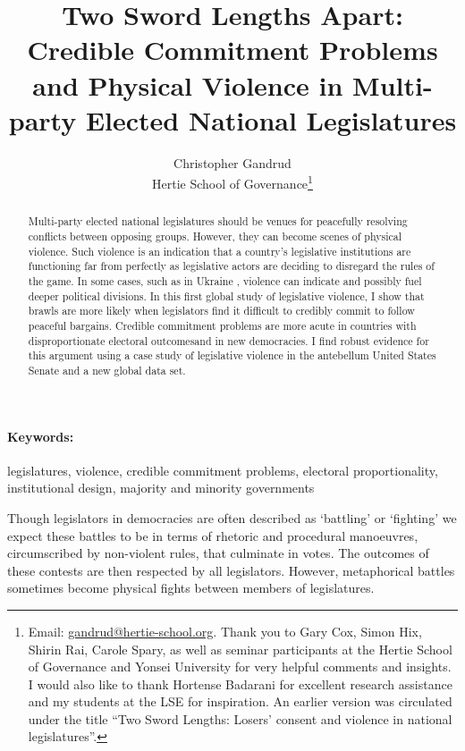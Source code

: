 \documentclass[a4paper]{article}\usepackage[]{graphicx}\usepackage[]{color}
\title{Two Sword Lengths Apart: Credible Commitment Problems and Physical Violence in Multi-party Elected National Legislatures}
\author{Christopher Gandrud \\
                Hertie School of Governance\footnote{Email: \href{mailto:gandrud@hertie-school.org}{gandrud@hertie-school.org}. Thank you to Gary Cox, Simon Hix, Shirin Rai, Carole Spary, as well as seminar participants at the Hertie School of Governance and Yonsei University for very helpful comments and insights. I would also like to thank Hortense Badarani for excellent research assistance and my students at the LSE for inspiration. An earlier version was circulated under the title ``Two Sword Lengths: Losers' consent and violence in national legislatures''.}}
\begin{document}
\maketitle

\begin{abstract}
Multi-party elected national legislatures should be venues for peacefully resolving conflicts between opposing groups. However, they can become scenes of physical violence. Such violence is an indication that a country's legislative institutions are functioning far from perfectly as legislative actors are deciding to disregard the rules of the game. In some cases, such as  in Ukraine , violence can indicate and possibly fuel deeper political divisions. In this first global study of legislative violence, I show that brawls are more likely when legislators find it difficult to credibly commit to follow peaceful bargains. Credible commitment problems are more acute in countries with disproportionate electoral outcomesand in new democracies. I find robust evidence for this argument using a case study of legislative violence in the antebellum United States Senate and a new global data set.
\end{abstract}


\paragraph{Keywords:} legislatures, violence, credible commitment problems, electoral proportionality, institutional design, majority and minority governments

\vspace{0.3cm}


Though legislators in democracies are often described as `battling' or `fighting' we expect these battles to be in terms of rhetoric and procedural manoeuvres, circumscribed by non-violent rules, that culminate in votes. The outcomes of these contests are then respected by all legislators. However, metaphorical battles sometimes become physical fights between members of legislatures.
\end{document}

